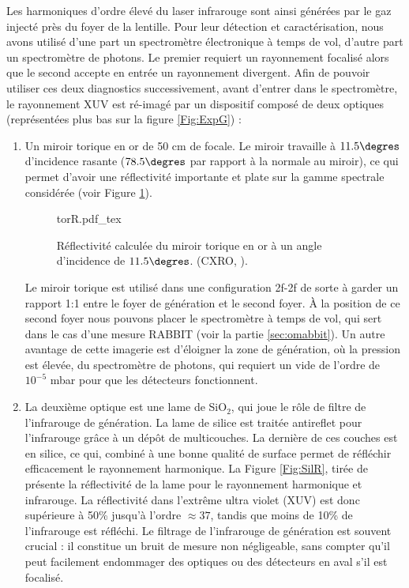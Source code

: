Les harmoniques d'ordre élevé du laser infrarouge sont ainsi générées par le gaz injecté près du foyer de la lentille. Pour leur détection et caractérisation, nous avons utilisé d'une part un spectromètre électronique à temps de vol, d'autre part un spectromètre de photons. Le premier requiert un rayonnement focalisé alors que le second accepte en entrée un rayonnement divergent. Afin de pouvoir utiliser ces deux diagnostics successivement, avant d'entrer dans le spectromètre, le rayonnement XUV est ré-imagé par un dispositif composé de deux optiques (représentées plus bas sur la figure \ref{Fig:ExpG}) :
\begin{enumerate}
\item Un miroir torique en or de 50 cm de focale. Le miroir travaille à $11.5\degres$ d'incidence rasante ($78.5\degres$ par rapport à la normale au miroir), ce qui permet d'avoir une réflectivité importante et plate sur la gamme spectrale considérée (voir Figure \ref{Fig:TorR}).

\begin{figure}[!ht]
\centering
\def\svgwidth{0.6\columnwidth}
{torR.pdf_tex}
\caption{Réflectivité calculée du miroir torique en or à un angle d'incidence de $11.5\degres$. (CXRO, ).}
\label{Fig:TorR}
\end{figure}
Le miroir torique est utilisé dans une configuration 2f-2f de sorte à garder un rapport\shorthandoff{:} 1:1 \shorthandon{:}entre le foyer de génération et le second foyer. \`{A} la position de ce second foyer nous pouvons placer le spectromètre à temps de vol, qui sert dans le cas d'une mesure RABBIT (voir la partie \ref{sec:omabbit}). Un autre avantage de cette imagerie est d'éloigner la zone de génération, où la pression est élevée, du spectromètre de photons, qui requiert un vide de l'ordre de $10^{-5}$ mbar pour que les détecteurs fonctionnent.\\

\item La deuxième optique est une lame de Si$\mbox{O}_{\mbox{2}}$, qui joue le rôle de filtre de l'infrarouge de génération. La lame de silice est traitée antireflet pour l'infrarouge grâce à un dépôt de multicouches. La dernière de ces couches est en silice, ce qui, combiné à une bonne qualité de surface permet de réfléchir efficacement le rayonnement harmonique. La Figure \ref{Fig:SilR}, tirée de  présente la réflectivité de la lame pour le rayonnement harmonique et infrarouge. La réflectivité dans l'extrême ultra violet (XUV) est donc supérieure à 50\% jusqu'à l'ordre $\approx 37$, tandis que moins de 10\% de l'infrarouge est réfléchi. Le filtrage de l'infrarouge de génération est souvent crucial : il constitue un bruit de mesure non négligeable, sans compter qu'il peut facilement endommager des optiques ou des détecteurs en aval s'il est focalisé.


\end{enumerate}
